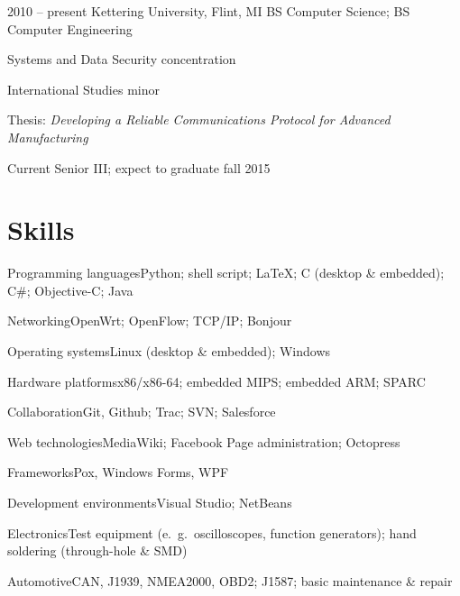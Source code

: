 \documentclass[12pt]{tccv/actccv}
\begin{document}
\begin{eventlist}

\item{2010 -- present}
     {Kettering University, Flint, MI}
     {BS Computer Science; BS Computer Engineering}
     
     Systems and Data Security concentration
      
     International Studies minor
     
     Thesis: \emph{Developing a Reliable Communications Protocol for Advanced Manufacturing}
     
     Current Senior III; expect to graduate fall 2015

\end{eventlist}

\section{Skills}

\begin{factlist}

\item{Programming languages}{Python; shell script; \LaTeX{}; C (desktop \& embedded); C\#; Objective-C; Java}
\item{Networking}{OpenWrt; OpenFlow; TCP/IP; Bonjour}
\item{Operating systems}{Linux (desktop \& embedded); Windows}
\item{Hardware platforms}{x86/x86-64; embedded MIPS; embedded ARM; SPARC}
\item{Collaboration}{Git, Github; Trac; SVN; Salesforce}
\item{Web technologies}{MediaWiki; Facebook Page administration; Octopress}
\item{Frameworks}{Pox, Windows Forms, WPF}
\item{Development environments}{Visual Studio; NetBeans}
\item{Electronics}{Test equipment (e.\ g.\ oscilloscopes, function generators); hand soldering (through-hole \& SMD)}
\item{Automotive}{CAN, J1939, NMEA2000, OBD2; J1587; basic maintenance \& repair}

\end{factlist}
\end{document}
